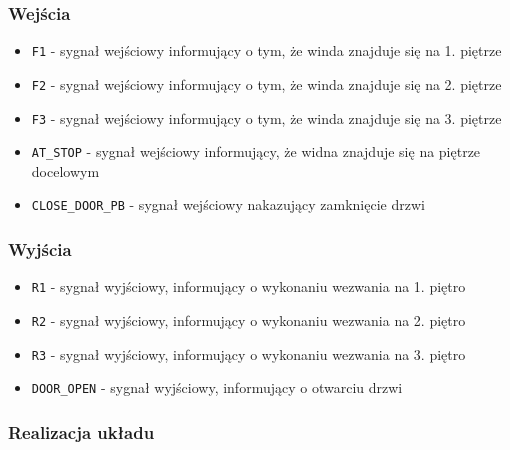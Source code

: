 \documentclass[a4paper]{article}
\begin{document}
\subsubsection{Wejścia}
\begin{itemize}
    \item \verb|F1| - sygnał wejściowy informujący o tym, że winda znajduje się na 1. piętrze 
    \item \verb|F2| - sygnał wejściowy informujący o tym, że winda znajduje się na 2. piętrze
    \item \verb|F3| - sygnał wejściowy informujący o tym, że winda znajduje się na 3. piętrze
    \item \verb|AT_STOP| - sygnał wejściowy informujący, że widna znajduje się na piętrze docelowym
    \item \verb|CLOSE_DOOR_PB| - sygnał wejściowy nakazujący zamknięcie drzwi
\end{itemize}

\subsubsection{Wyjścia}
\begin{itemize}
    \item \verb|R1| - sygnał wyjściowy, informujący o wykonaniu wezwania na 1. piętro
    \item \verb|R2| - sygnał wyjściowy, informujący o wykonaniu wezwania na 2. piętro
    \item \verb|R3| - sygnał wyjściowy, informujący o wykonaniu wezwania na 3. piętro
    \item \verb|DOOR_OPEN| - sygnał wyjściowy, informujący o otwarciu drzwi
\end{itemize}

\subsubsection{Realizacja układu}
\end{document}

